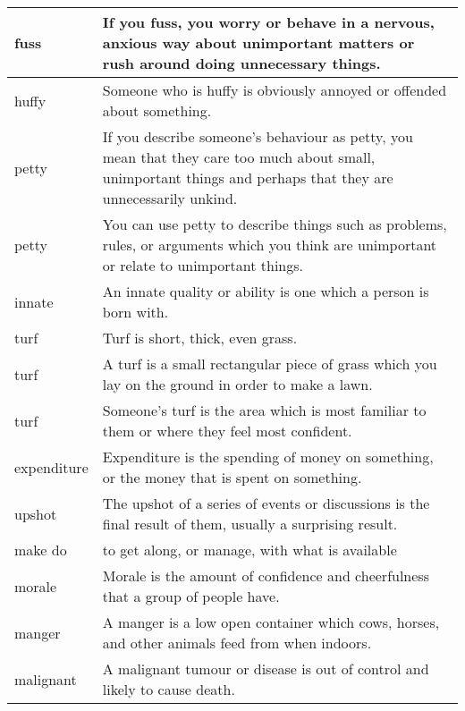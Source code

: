 \documentclass{article}
\begin{document}
\begin{center}
\begin{longtable}{|l|p{7.8cm}|}
\hline
fuss
&
If you fuss, you worry or behave in a nervous, anxious way about unimportant matters or rush around doing unnecessary things.
\\

\hline
huffy
&
Someone who is huffy is obviously annoyed or offended about something.
\\

\hline
petty
&
If you describe someone's behaviour as petty, you mean that they care too much about small, unimportant things and perhaps that they are unnecessarily unkind.
\\

\hline
petty
&
You can use petty to describe things such as problems, rules, or arguments which you think are unimportant or relate to unimportant things.
\\

\hline
innate
&
An innate quality or ability is one which a person is born with.
\\

\hline
turf
&
Turf is short, thick, even grass.
\\

\hline
turf
&
A turf is a small rectangular piece of grass which you lay on the ground in order to make a lawn.
\\

\hline
turf
&
Someone's turf is the area which is most familiar to them or where they feel most confident.
\\

\hline
expenditure
&
Expenditure is the spending of money on something, or the money that is spent on something.
\\

\hline
upshot
&
The upshot of a series of events or discussions is the final result of them, usually a surprising result.
\\


\hline
make do
&
to get along, or manage, with what is available
\\

\hline
morale
&
Morale is the amount of confidence and cheerfulness that a group of people have.
\\

\hline
manger
&
A manger is a low open container which cows, horses, and other animals feed from when indoors.
\\

\hline
malignant
&
A malignant tumour or disease is out of control and likely to cause death.
\\


\end{longtable}
\end{center}
\end{document}
